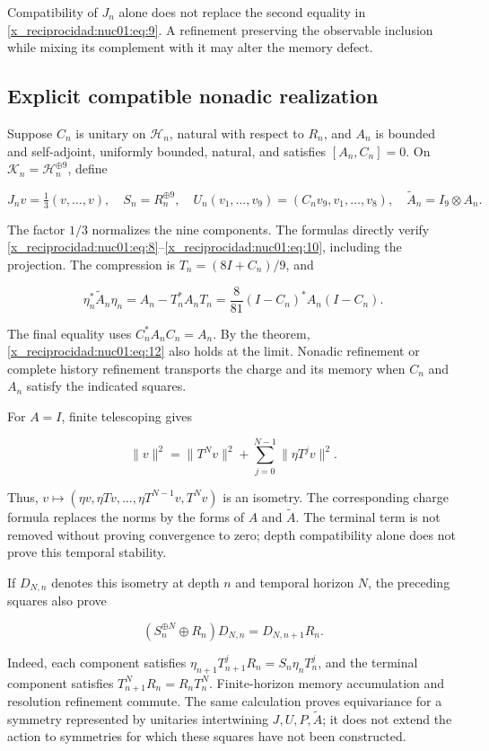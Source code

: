 Compatibility of \(J_n\) alone does not replace the second equality in \eqref{x_reciprocidad:nuc01:eq:9}. A refinement preserving the observable inclusion while mixing its complement with it may alter the memory defect.

\subsection{Explicit compatible nonadic realization}

Suppose \(C_n\) is unitary on \(\mathscr H_n\), natural with respect to \(R_n\), and \(A_n\) is bounded and self-adjoint, uniformly bounded, natural, and satisfies \([A_n,C_n]=0\). On \(\mathscr K_n=\mathscr H_n^{\oplus9}\), define

\[
J_nv=\tfrac13(v,\ldots,v),\quad
S_n=R_n^{\oplus9},\quad
U_n(v_1,\ldots,v_9)=(C_nv_9,v_1,\ldots,v_8),
\quad \widetilde A_n=I_9\otimes A_n.
\]

The factor \(1/3\) normalizes the nine components. The formulas directly verify \eqref{x_reciprocidad:nuc01:eq:8}–\eqref{x_reciprocidad:nuc01:eq:10}, including the projection. The compression is \(T_n=(8I+C_n)/9\), and

\begin{equation}
\eta_n^*\widetilde A_n\eta_n
=A_n-T_n^*A_nT_n
=\frac8{81}(I-C_n)^*A_n(I-C_n).
\label{x_reciprocidad:nuc01:eq:12}
\end{equation}

The final equality uses \(C_n^*A_nC_n=A_n\). By the theorem, \eqref{x_reciprocidad:nuc01:eq:12} also holds at the limit. Nonadic refinement or complete history refinement transports the charge and its memory when \(C_n\) and \(A_n\) satisfy the indicated squares.

For \(A=I\), finite telescoping gives

\[
\|v\|^2=\|T^Nv\|^2+\sum_{j=0}^{N-1}\|\eta T^jv\|^2.
\]

Thus, \(v\mapsto(\eta v,\eta Tv,\ldots,\eta T^{N-1}v,T^Nv)\) is an isometry. The corresponding charge formula replaces the norms by the forms of \(A\) and \(\widetilde A\). The terminal term is not removed without proving convergence to zero; depth compatibility alone does not prove this temporal stability.

If \(D_{N,n}\) denotes this isometry at depth \(n\) and temporal horizon \(N\), the preceding squares also prove

\[
(S_n^{\oplus N}\oplus R_n)D_{N,n}
=D_{N,n+1}R_n.
\]

Indeed, each component satisfies \(\eta_{n+1}T_{n+1}^jR_n=S_n\eta_nT_n^j\), and the terminal component satisfies \(T_{n+1}^NR_n=R_nT_n^N\). Finite-horizon memory accumulation and resolution refinement commute. The same calculation proves equivariance for a symmetry represented by unitaries intertwining \(J,U,P,\widetilde A\); it does not extend the action to symmetries for which these squares have not been constructed.

